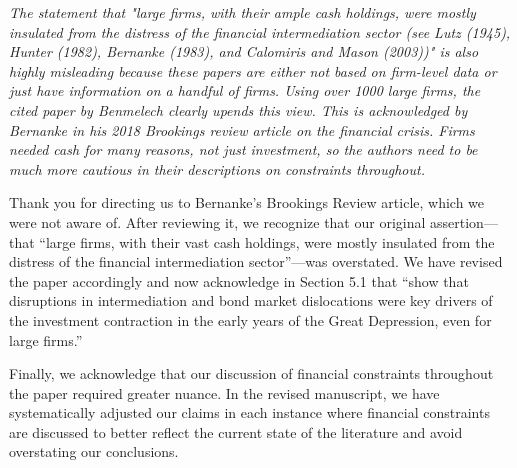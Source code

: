 \textit{\textcolor{red!60!black}{
The statement that "large firms, with their ample cash holdings, were mostly insulated from the distress of the financial intermediation sector (see Lutz (1945), Hunter (1982), Bernanke (1983), and Calomiris and Mason (2003))" is also highly misleading because these papers are either not based on firm-level data or just have information on a handful of firms. Using over 1000 large firms, the cited paper by Benmelech clearly upends this view. This is acknowledged by Bernanke in his 2018 Brookings review article on the financial crisis. Firms needed cash for many reasons, not just investment, so the authors need to be much more cautious in their descriptions on constraints throughout.
}}

\bigskip

\noindent Thank you for directing us to Bernanke's Brookings Review article, which we were not aware of. After reviewing it, we recognize that our original assertion---that ``large firms, with their vast cash holdings, were mostly insulated from the distress of the financial intermediation sector''---was overstated. We have revised the paper accordingly and now acknowledge in Section 5.1 that \cite{Benmelech2018} ``show that disruptions in intermediation and bond market dislocations were key drivers of the investment contraction in the early years of the Great Depression, even for large firms.''

Finally, we acknowledge that our discussion of financial constraints throughout the paper required greater nuance. In the revised manuscript, we have systematically adjusted our claims in each instance where financial constraints are discussed to better reflect the current state of the literature and avoid overstating our conclusions.
